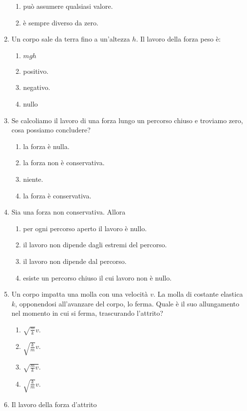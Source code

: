 \documentclass{article}
\begin{document}
\begin{enumerate}
\begin{enumerate}[label=\Alph*.]
    \item può assumere qualsiasi valore.
    \item è sempre diverso da zero.
  \end{enumerate}
  \item Un corpo sale da terra fino a un'altezza $h$. Il lavoro della forza peso è:
  \begin{enumerate}[label=\Alph*.]
    \item $mgh$
    \item positivo.
    \item negativo.
    \item nullo
  \end{enumerate}
  \item Se calcoliamo il lavoro di una forza lungo un percorso chiuso e troviamo zero, cosa possiamo concludere?
  \begin{enumerate}[label=\Alph*.]
    \item la forza è nulla.
    \item la forza non è conservativa.
    \item niente.
    \item la forza è conservativa.
  \end{enumerate}
  \item Sia  una forza non conservativa. Allora
  \begin{enumerate}[label=\Alph*.]
    \item per ogni percorso aperto il lavoro è nullo.
    \item il lavoro non dipende dagli estremi del percorso.
    \item il lavoro non dipende dal percorso.
    \item esiste un percorso chiuso il cui lavoro non è nullo.
  \end{enumerate}
  \item Un corpo impatta una molla con una velocità $v$. La molla di costante elastica $k$, opponendosi all'avanzare del corpo, lo ferma. Quale è il suo allungamento nel momento in cui si ferma, trascurando l'attrito?
  \begin{enumerate}[label=\Alph*.]
    \item $\sqrt{\frac{m}{k}}v$.
    \item $\sqrt{\frac{k}{m}}v$.
    \item $\sqrt{\frac{m}{k}v}$.
    \item $\sqrt{\frac{k}{m}}v$.
  \end{enumerate}
  \item Il lavoro della forza d'attrito

\end{enumerate}
\end{document}
